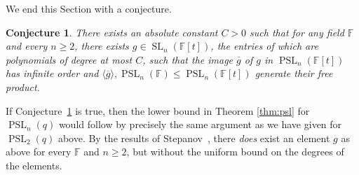 \documentclass[a4paper,11pt]{amsproc}
\newcommand{\ints}{\mathbb{Z}}%
\newcommand{\finfield}{\mathbb{F}}%
\newcommand{\freegrp}{\mathbf F}%
\DeclareMathOperator{\SL}{SL}%
\DeclareMathOperator{\PSL}{PSL}%
\theoremstyle{plain}
\newtheorem{conj}[lemma]{Conjecture}
\theoremstyle{definition}
\begin{document}
	
	
	
	We end this Section with a conjecture.
	
	\begin{conj} \label{SLnPolyFreeProdConj}
		There exists an absolute constant $C>0$ such that for any field $\mathbb{F}$ and every $n \geq 2$, there exists $g \in \SL_n (\mathbb{F}[t])$, the entries of which are polynomials of degree at most $C$, such that the image $\overline{g}$ of $g$ in $\PSL_n (\mathbb{F}[t])$ has infinite order and $\langle \overline{g} \rangle , \PSL_n (\mathbb{F}) \leq \PSL_n (\mathbb{F}[t])$ generate their free product. 
	\end{conj}
	
	If Conjecture~\ref{SLnPolyFreeProdConj} is true, then the lower bound in Theorem \ref{thm:psl} for $\PSL_n(q)$ would follow by precisely the same argument as we have given for $\PSL_2(q)$ above. By the results of Stepanov~\cite{stepanov2010about}, there \emph{does} exist an element $g$ as above for every $\mathbb{F}$ and $n \geq 2$, but without the uniform bound on the degrees of the elements.
	
\end{document}
